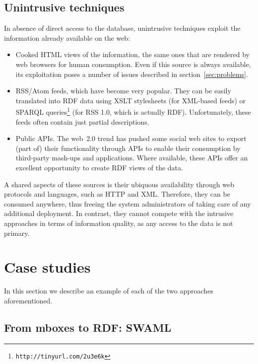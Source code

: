 \documentclass{../templates/www2008-submission}
\begin{document}
\subsection{Unintrusive techniques}

In absence of direct access to the database, unintrusive
techniques exploit the information already available on the web:

\begin{itemize}

\item Cooked HTML views of the information, the same ones that
are rendered by web browsers for human consumption. Even if this 
source is always available, its exploitation poses a number of 
issues described in section~\ref{sec:problems}.

\item RSS/Atom feeds, which have become very popular. They can be easily
translated into RDF data using XSLT stylesheets (for XML-based feeds) or 
SPARQL queries\footnote{\texttt{http://tinyurl.com/2u3e6k}} (for RSS 1.0, 
which is actually RDF). Unfortunately, these feeds often contain just 
partial descriptions.

\item Public APIs. The web~2.0 trend has pushed some social web
sites to export (part of) their functionality through APIs
to enable their consumption by third-party mash-ups and applications.
Where available, these APIs offer an excellent opportunity to
create RDF views of the data.

\end{itemize}

A shared aspects of these sources is their ubiquous availability through
web protocols and languages, such as HTTP and XML. Therefore, they
can be consumed anywhere, thus freeing the system administrators of
taking care of any additional deployment. In contrast, they cannot compete
with the intrusive approaches in terms of information quality, as
any access to the data is not primary.

\section{Case studies}

In this section we describe an example of each of the two approaches
aforementioned.

\subsection{From mboxes to RDF: SWAML}
\end{document}
